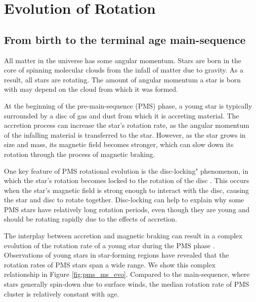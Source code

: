 \section{Evolution of Rotation}
\label{sec:evolution}

\subsection{From birth to the terminal age main-sequence}

All matter in the universe has some angular momentum. 
Stars are born in the core of spinning molecular clouds from the infall of matter due to gravity. 
As a result, all stars are rotating.
The amount of angular momentum a star is born with may depend on the cloud from which it was formed.

At the beginning of the pre-main-sequence (PMS) phase, a young star is typically surrounded by a disc of gas and dust from which it is accreting material.
The accretion process can increase the star's rotation rate, as the angular momentum of the infalling material is transferred to the star.
However, as the star grows in size and mass, its magnetic field becomes stronger, which can slow down its rotation through the process of magnetic braking.

One key feature of PMS rotational evolution is the disc-locking" phenomenon, in which the star's rotation becomes locked to the rotation of the disc \citep{eggenberger_angular_2012}.
This occurs when the star's magnetic field is strong enough to interact with the disc, causing the star and disc to rotate together.
Disc-locking can help to explain why some PMS stars have relatively long rotation periods, even though they are young and should be rotating rapidly due to the effects of accretion.

The interplay between accretion and magnetic braking can result in a complex evolution of the rotation rate of a young star during the PMS phase \citep{gallet_improved_2013}.
Observations of young stars in star-forming regions have revealed that the rotation rates of PMS stars span a wide range.
We show this complex relationship in Figure \ref{fig:pms_ms_evo}.
Compared to the main-sequence, where stars generally spin-down due to surface winds, the median rotation rate of PMS cluster is relatively constant with age.

